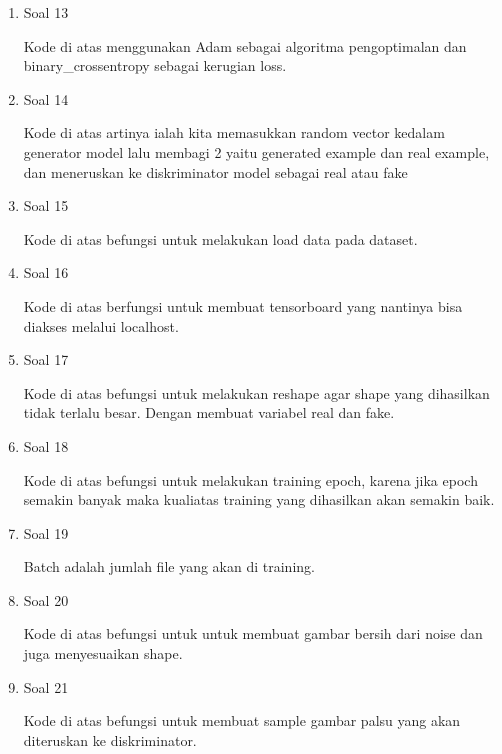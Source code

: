\begin{enumerate}
	\item Soal 13
	\hfill\break
	
	Kode di atas menggunakan Adam sebagai algoritma pengoptimalan dan binary\_crossentropy sebagai kerugian loss. 

	\item Soal 14
	\hfill\break
	
	Kode di atas artinya ialah kita memasukkan random vector kedalam generator model lalu membagi 2 yaitu generated example dan real example, dan meneruskan ke diskriminator model sebagai real atau fake

	\item Soal 15
	\hfill\break
	
	Kode di atas befungsi untuk melakukan load data pada dataset.

	\item Soal 16
	\hfill\break
	
	Kode di atas berfungsi untuk membuat tensorboard yang nantinya bisa diakses melalui localhost.

	\item Soal 17
	\hfill\break
	
	Kode di atas befungsi untuk melakukan reshape agar shape yang dihasilkan tidak terlalu besar. Dengan membuat variabel real dan fake.

	\item Soal 18
	\hfill\break
	
	Kode di atas befungsi untuk melakukan training epoch, karena jika epoch semakin banyak maka kualiatas training yang dihasilkan akan semakin baik.

	\item Soal 19
	\hfill\break
	
	Batch adalah jumlah file yang akan di training.

	\item Soal 20
	\hfill\break
	
	Kode di atas befungsi untuk untuk membuat gambar bersih dari noise dan juga menyesuaikan shape.

	\item Soal 21
	\hfill\break
	
	Kode di atas befungsi untuk membuat sample gambar palsu yang akan diteruskan ke diskriminator.


\end{enumerate}

